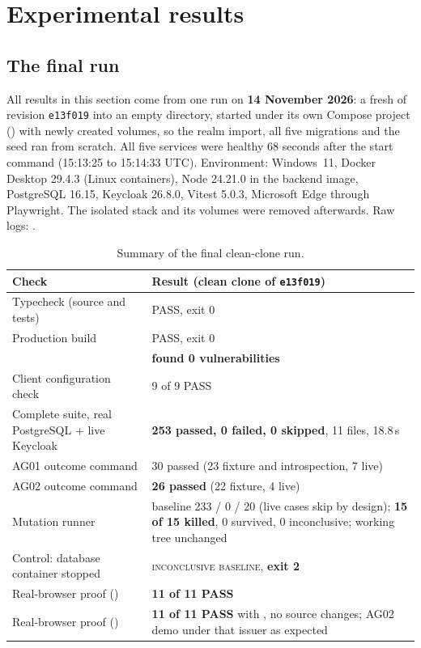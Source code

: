 \section{Experimental results}
\label{sec:results}

\subsection{The final run}
All results in this section come from one run on \textbf{14 November 2026}: a fresh  of revision \texttt{e13f019} into an empty directory, started under its own Compose project () with newly created volumes, so the realm import, all five migrations and the seed ran from scratch. All five services were healthy 68 seconds after the start command (15:13:25 to 15:14:33 UTC). Environment: Windows~11, Docker Desktop 29.4.3 (Linux containers), Node 24.21.0 in the backend image, PostgreSQL 16.15, Keycloak 26.8.0, Vitest 5.0.3, Microsoft Edge through Playwright. The isolated stack and its volumes were removed afterwards. Raw logs: .

\begin{table}[H]
\centering
\small
\begin{tabularx}{\textwidth}{@{}P{4.6cm} L@{}}
\toprule
\textbf{Check} & \textbf{Result (clean clone of \texttt{e13f019})}\\
\midrule
Typecheck (source and tests) & PASS, exit 0\\
Production build & PASS, exit 0\\
 & \textbf{found 0 vulnerabilities}\\
Client configuration check & 9 of 9 PASS\\
Complete suite, real PostgreSQL + live Keycloak & \textbf{253 passed, 0 failed, 0 skipped}, 11 files, 18.8\,s\\
AG01 outcome command & 30 passed (23 fixture and introspection, 7 live)\\
AG02 outcome command & \textbf{26 passed} (22 fixture, 4 live)\\
Mutation runner & baseline 233 / 0 / 20 (live cases skip by design); \textbf{15 of 15 killed}, 0 survived, 0 inconclusive; working tree unchanged\\
Control: database container stopped & \textsc{inconclusive baseline}, \textbf{exit 2}\\
Real-browser proof () & \textbf{11 of 11 PASS}\\
Real-browser proof () & \textbf{11 of 11 PASS} with , no source changes; AG02 demo under that issuer as expected\\
\bottomrule
\end{tabularx}
\caption{Summary of the final clean-clone run.}
\label{tab:final}
\end{table}

